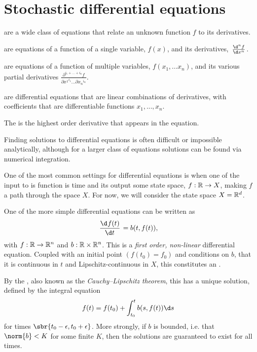
\section{Stochastic differential equations}

 are a wide class of equations that relate an unknown function \(f\) to its derivatives.

 are equations of a function of a single variable, \(f(x)\), and its derivatives, \(\od[n]{f}{x}\).

 are equations of a function of multiple variables, \(f(x_1, ... x_n)\), and its various partial derivatives \(\frac{\partial^{i_1+...+i_n}{f}}{\partial{x^1}^{i_1}...\partial{x_n}^{i_n}}\).

 are differential equations that are linear combinations of derivatives, with coefficients that are differentiable functions \(x_1, ..., x_n\).

The  is the highest order derivative that appears in the equation.

Finding solutions to differential equations is often difficult or impossible analytically, although for a larger class of equations solutions can be found via numerical integration.

One of the most common settings for differential equations is when one of the input to is function is time and its output some state space, \(f: \mathbb{R}\to X\), making \(f\) a path through the space \(X\).
For now, we will consider the state space \(X=\mathbb{R}^d\).

One of the more simple differential equations can be written as \[\od{f(t)}{t} = b(t, f(t)),\] with \(f: \mathbb{R} \to \mathbb{R}^n\) and \(b: \mathbb{R} \times\mathbb{R}^n\).
This is a \emph{first order, non-linear} differential equation.
Coupled with an initial point \((f(t_0) = f_0)\) and conditions on \(b\), that it is continuous in \(t\) and Lipschitz-continuous in \(X\), this constitutes an .

By the , also known as the \emph{Cauchy–Lipschitz theorem}, this has a unique solution, defined by the integral equation \[f(t) = f(t_0) + \int_{t_0}^t b(s, f(t)) \d s\] for times \(\sbr{t_0 - \epsilon, t_0+\epsilon}\). More strongly, if \(b\) is bounded, i.e. that \(\norm{b} < K\) for some finite \(K\), then the solutions are guaranteed to exist for all times.

